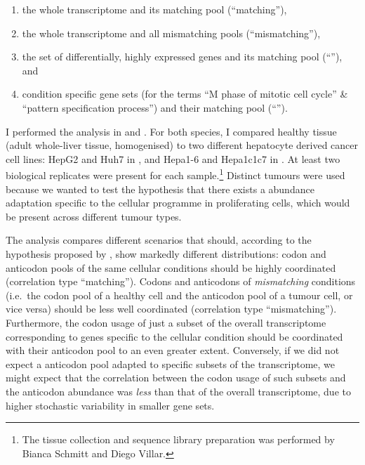 \begin{enumerate}
    \item the whole transcriptome and its matching \trna pool (“matching”),
    \item the whole transcriptome and all mismatching \trna pools
        (“mismatching”),
    \item the set of differentially, highly expressed \mrna genes and its
        matching \trna pool (“”), and
    \item condition specific gene sets (for the \go terms “M phase of mitotic
        cell cycle” \& “pattern specification process”) and their matching \trna
        pool (“”).
\end{enumerate}

I performed the analysis in \mmu and \hsa. For both species, I compared healthy
tissue (adult whole-liver tissue, homogenised) to two different hepatocyte
derived cancer cell lines: HepG2 and Huh7 in \hsa, and Hepa1-6 and Hepa1c1c7 in
\mmu. At least two biological replicates were present for each
sample.\footnote{The tissue collection and sequence library preparation was
performed by Bianca Schmitt and Diego Villar.} Distinct tumours were used
because we wanted to test the hypothesis that there exists a \trna abundance
adaptation specific to the cellular programme in proliferating cells, which
would be present across different tumour types.

The analysis compares different scenarios that should, according to the
hypothesis proposed by \citet{Gingold:2014}, show markedly different
distributions: codon and anticodon pools of the same cellular conditions should
be highly coordinated (correlation type “matching”). Codons and anticodons of
\emph{mismatching} conditions (i.e.\ the codon pool of a healthy cell and the
anticodon pool of a tumour cell, or vice versa) should be less well coordinated
(correlation type “mismatching”). Furthermore, the codon usage of just a subset
of the overall transcriptome corresponding to genes specific to the cellular
condition should be coordinated with their anticodon pool to an even greater
extent. Conversely, if we did not expect a \trna anticodon pool adapted to
specific subsets of the transcriptome, we might expect that the correlation
between the codon usage of such subsets and the anticodon abundance was
\emph{less} than that of the overall transcriptome, due to higher stochastic
variability in smaller gene sets.


